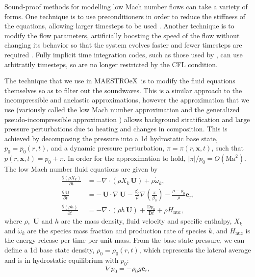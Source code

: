 \documentclass[a4paper]{jpconf}
\newcommand{\maestroex}{{\sffamily MAESTROeX}}
\newcommand{\Ub}{{\,\bm{U}}}
\newcommand{\pd}[2]{\frac{\partial #1}{\partial #2}}
\newcommand{\md}[2]{\frac{\mathrm{D} #1}{\mathrm{D} #2}}
\begin{document}
Sound-proof methods for modelling low Mach number flows can take a variety of forms. One technique is to use preconditioners in order to reduce the stiffness of the equations, allowing larger timesteps to be used \cite{Miczek2014,Barsukow2016}. Another technique is to modify the flow parameters, artificially boosting the speed of the flow without changing its behavior so that the system evolves faster and fewer timesteps are required \citep{Rempel2005,Hotta2012}. Fully implicit time integration codes, such as those used by \cite{Viallet2011,Viallet2015,Goffrey2016}, can use arbitratily timesteps, so are no longer restricted by the CFL condition.

The technique that we use in \maestroex~is to modify the fluid equations themselves so as to filter out the soundwaves. This is a similar approach to the incompressible \cite{Boussinesq1901} and anelastic \cite{Ogura1962a,Gough1968,Durran1989} approximations, however the approximation that we use (variously called the low Mach number approximation \cite{Day2000,Almgren2006a,Nonaka2010} and the generalized pseudo-incompressible approximation \cite{Vasil2013}) allows background stratification and large pressure perturbations due to heating and changes in composition. This is achieved by decomposing the pressure into a 1d hydrostatic base state, $p_0 = p_0(r, t)$, and a dynamic pressure perturbation, $\pi = \pi(r, \bm{x}, t)$, such that $p(r, \bm{x}, t) = p_0 + \pi$. In order for the approximation to hold, $|\pi|/p_0 = O(\mathrm{Ma}^2)$. The low Mach number fluid equations are given by 
\begin{align}
    \pd{\left(\rho X_k\right)}{t} &= - \nabla\cdot\left(\rho X_k \Ub \right) + \rho\dot{\omega}_k, \\
    \pd{\Ub}{t} &= - \Ub\cdot\nabla\Ub - \frac{\beta_0}{\rho}\nabla\left(\frac{\pi}{\beta_0}\right) - \frac{\rho - \rho_0}{\rho}\bm{e}_r,\\
    \pd{\left(\rho h\right)}{t} &= -\nabla\cdot\left(\rho h \Ub\right) + \md{p_0}{t} + \rho H_{\mathrm{nuc}},
\end{align}
where $\rho$, $\Ub$ and $h$ are the mass density, fluid velocity and specific enthalpy, $X_k$ and $\dot{\omega}_k$ are the species mass fraction and production rate of species $k$, and $H_{\mathrm{nuc}}$ is the energy release per time per unit mass. From the base state pressure, we can define a 1d base state density, $\rho_0 = \rho_0(r, t)$, which represents the lateral average and is in hydrostatic equilibrium with $p_0$:
\begin{equation}
    \nabla p_0 = -\rho_0 g \bm{e}_r,
\end{equation}
\end{document}
